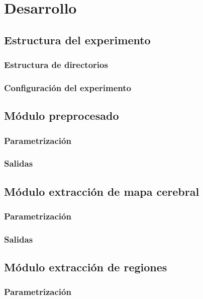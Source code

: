 \chapter{Desarrollo}
\section{Estructura del experimento}
\subsection{Estructura de directorios}
\subsection{Configuración del experimento}
\section{Módulo preprocesado}
\subsection{Parametrización}
\subsection{Salidas}
\section{Módulo extracción de mapa cerebral}
\subsection{Parametrización}
\subsection{Salidas}
\section{Módulo extracción de regiones}
\subsection{Parametrización}
